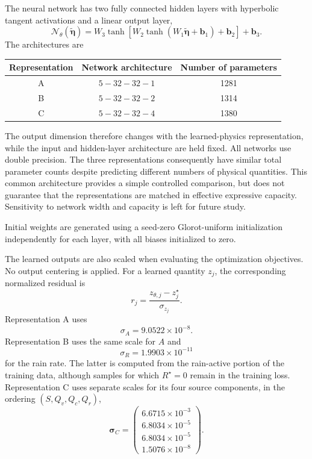 \documentclass[12pt]{article}
\begin{document}
The neural network has two fully connected hidden layers with hyperbolic
tangent activations and a linear output layer,
\begin{equation}
	\mathcal{N}_\theta(\widetilde{\boldsymbol{\eta}})
	=
	W_3
	\tanh\!\left[
	W_2
	\tanh\!\left(
	W_1\widetilde{\boldsymbol{\eta}}+\mathbf b_1
	\right)
	+\mathbf b_2
	\right]
	+\mathbf b_3.
	\label{eq:network_architecture}
\end{equation}
The architectures are
\begin{center}
	\begin{tabular}{c|c|c}
		Representation & Network architecture & Number of parameters \\
		\hline
		A & $5\!-\!32\!-\!32\!-\!1$ & 1281 \\
		B & $5\!-\!32\!-\!32\!-\!2$ & 1314 \\
		C & $5\!-\!32\!-\!32\!-\!4$ & 1380
	\end{tabular}
\end{center}
The output dimension therefore changes with the learned-physics
representation, while the input and hidden-layer architecture are held fixed.
All networks use double precision. The three representations consequently have
similar total parameter counts despite predicting different numbers of
physical quantities. This common architecture provides a simple controlled
comparison, but does not guarantee that the representations are matched in
effective expressive capacity. Sensitivity to network width and capacity is
left for future study.

Initial weights are generated using a seed-zero Glorot-uniform initialization
independently for each layer, with all biases initialized to zero.

The learned outputs are also scaled when evaluating the optimization
objectives. No output centering is applied. For a learned quantity $z_j$, the
corresponding normalized residual is
\begin{equation}
	r_j
	=
	\frac{
		z_{\theta,j}-z_j^\star
	}{
		\sigma_{z_j}
	}.
	\label{eq:output_normalization}
\end{equation}
Representation A uses
\begin{equation}
	\sigma_A = 9.0522\times10^{-8}.
\end{equation}
Representation B uses the same scale for $A$ and
\begin{equation}
	\sigma_R = 1.9903\times10^{-11}
\end{equation}
for the rain rate. The latter is computed from the rain-active portion of the
training data, although samples for which $R^\star=0$ remain in the training
loss. Representation C uses separate scales for its four source components,
in the ordering $(S,Q_v,Q_c,Q_r)$,
\begin{equation}
	\boldsymbol{\sigma}_C
	=
	\begin{pmatrix}
		6.6715\times10^{-3} \\
		6.8034\times10^{-5} \\
		6.8034\times10^{-5} \\
		1.5076\times10^{-8}
	\end{pmatrix}.
\end{equation}
\end{document}
